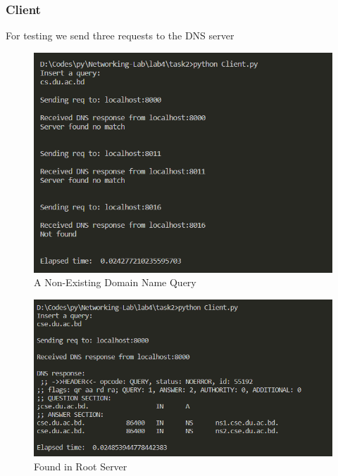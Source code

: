 \documentclass[11pt]{article}
\begin{document}
        \subsubsection*{Client}
        For testing we send three requests to the DNS server
            \begin{figure}[!h]
                \centering
                \includegraphics*[width=\textwidth]{task2_client_unsuccessful.png}
                \caption{A Non-Existing Domain Name Query}
            \end{figure}
    
            \begin{figure}[!h]
                \centering
                \includegraphics*[width=\textwidth]{task2_client_back_from_root.png}
                \caption{Found in Root Server}
            \end{figure}
    
\end{document}
